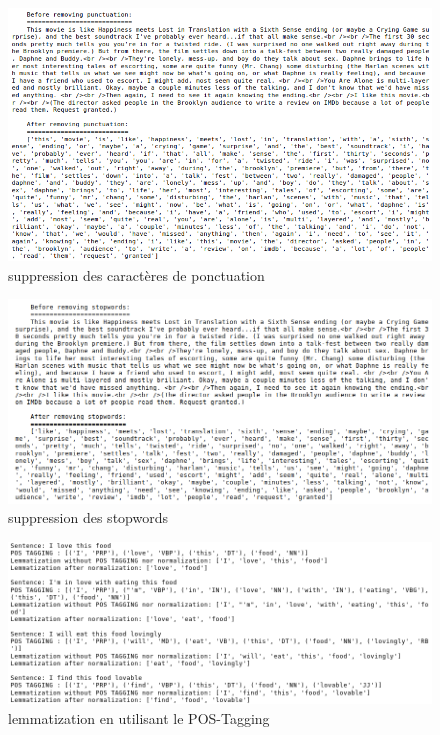 \documentclass[12pt,a4paper]{report}
\theoremstyle{definition}
\begin{document}
\begin{appendices}
\begin{figure}[!ht]
  \centering
  \includegraphics[scale=0.5]{images/snapshots/remove_punctuation.png}
  \caption{suppression des caractères de ponctuation}
  \label{fig:remove_punctuation}
\end{figure}

\begin{figure}[!ht]
  \centering
  \includegraphics[scale=0.4]{images/snapshots/remove_stopwords.png}
  \caption{suppression des stopwords}
  \label{fig:remove_stopwords}
\end{figure}

\begin{figure}[!ht]
  \centering
  \includegraphics[scale=0.4]{images/snapshots/lemmatization.png}
  \caption{lemmatization en utilisant le POS-Tagging}
  \label{fig:lemmatization}
\end{figure}

\end{appendices}
\end{document}
